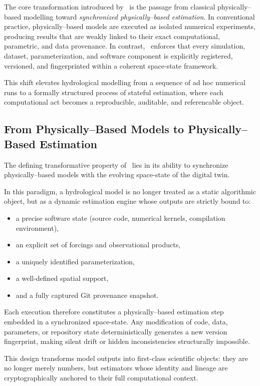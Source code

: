 The core transformation introduced by \hydrot\ is the passage from classical physically--based modelling toward \emph{synchronized physically--based estimation}. In conventional practice, physically--based models are executed as isolated numerical experiments, producing results that are weakly linked to their exact computational, parametric, and data provenance. In contrast, \hydrot\ enforces that every simulation, dataset, parameterization, and software component is explicitly registered, versioned, and fingerprinted within a coherent space-state framework.

This shift elevates hydrological modelling from a sequence of ad hoc numerical runs to a formally structured process of stateful estimation, where each computational act becomes a reproducible, auditable, and referencable object.

\subsection{From Physically--Based Models to Physically--Based Estimation}

The defining transformative property of \hydrot\ lies in its ability to synchronize physically--based models with the evolving space-state of the digital twin.

In this paradigm, a hydrological model is no longer treated as a static algorithmic object, but as a dynamic estimation engine whose outputs are strictly bound to:
\begin{itemize}
\item a precise software state (source code, numerical kernels, compilation environment),
\item an explicit set of forcings and observational products,
\item a uniquely identified parameterization,
\item a well-defined spatial support,
\item and a fully captured Git provenance snapshot.
\end{itemize}

Each execution therefore constitutes a physically--based estimation step embedded in a synchronized space-state. Any modification of code, data, parameters, or repository state deterministically generates a new version fingerprint, making silent drift or hidden inconsistencies structurally impossible.

This design transforms model outputs into first-class scientific objects: they are no longer merely numbers, but estimators whose identity and lineage are cryptographically anchored to their full computational context.

